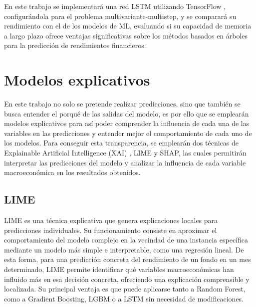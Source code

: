 En este trabajo se implementará una red LSTM utilizando TensorFlow \cite{tensorflow}, configurándola para el problema multivariante-multistep, y se comparará su rendimiento con el de los modelos de ML, evaluando si su capacidad de memoria a largo plazo ofrece ventajas significativas sobre los métodos basados en árboles para la predicción de rendimientos financieros.

\section{Modelos explicativos}
\label{sec:Interpretabilidad}
En este trabajo no solo se pretende realizar predicciones, sino que también se busca entender el porqué de las salidas del modelo, es por ello que se emplearán modelos explicativos para así poder comprender la influencia de cada una de las variables en las predicciones y entender mejor el comportamiento de cada uno de los modelos. Para conseguir esta transparencia, se emplearán dos técnicas de Explainable Artificial Intelligence (XAI) \cite{xai_ibm}, LIME y SHAP, las cuales permitirán interpretar las predicciones del modelo y analizar la influencia de cada variable macroeconómica en los resultados obtenidos.

\subsection{LIME}
LIME \cite{xai_lime} es una técnica explicativa que genera explicaciones locales para predicciones individuales. Su funcionamiento consiste en aproximar el comportamiento del modelo complejo en la vecindad de una instancia específica mediante un modelo más simple e interpretable, como una regresión lineal. De esta forma, para una predicción concreta del rendimiento de un fondo en un mes determinado, LIME permite identificar qué variables macroeconómicas han influido más en esa decisión concreta, ofreciendo una explicación comprensible y localizada. Su principal ventaja es que puede aplicarse tanto a Random Forest, como a Gradient Boosting, LGBM o a LSTM sin necesidad de modificaciones.

